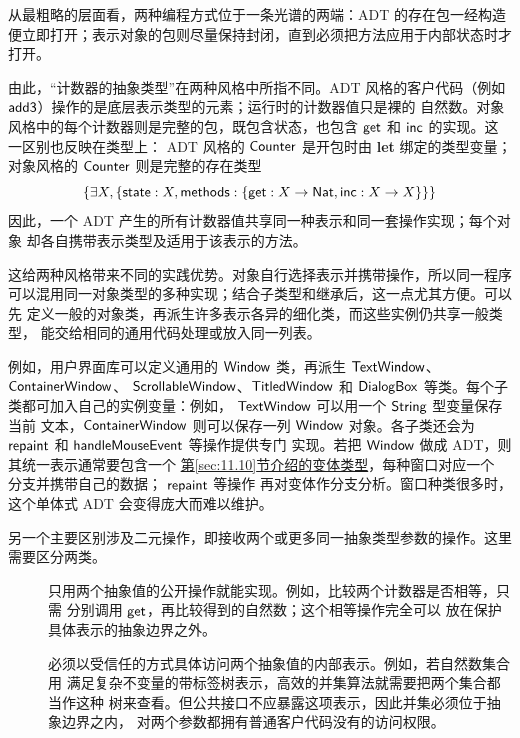 从最粗略的层面看，两种编程方式位于一条光谱的两端：ADT 的存在包一经构造
便立即打开；表示对象的包则尽量保持封闭，直到必须把方法应用于内部状态时才
打开。

由此，“计数器的抽象类型”在两种风格中所指不同。ADT 风格的客户代码（例如
\(\mathsf{add3}\)）操作的是底层表示类型的元素；运行时的计数器值只是裸的
自然数。对象风格中的每个计数器则是完整的包，既包含状态，也包含
\(\mathsf{get}\) 和 \(\mathsf{inc}\) 的实现。这一区别也反映在类型上：
ADT 风格的 \(\mathsf{Counter}\) 是开包时由 \textbf{let} 绑定的类型变量；
对象风格的 \(\mathsf{Counter}\) 则是完整的存在类型
\[
\{\exists X,
  \{\mathsf{state}:X,
    \mathsf{methods}:\{\mathsf{get}:X\to\mathsf{Nat},
                         \mathsf{inc}:X\to X\}\}\}
\]
因此，一个 ADT 产生的所有计数器值共享同一种表示和同一套操作实现；每个对象
却各自携带表示类型及适用于该表示的方法。

这给两种风格带来不同的实践优势。对象自行选择表示并携带操作，所以同一程序
可以混用同一对象类型的多种实现；结合子类型和继承后，这一点尤其方便。可以先
定义一般的对象类，再派生许多表示各异的细化类，而这些实例仍共享一般类型，
能交给相同的通用代码处理或放入同一列表。

例如，用户界面库可以定义通用的 \(\mathsf{Window}\) 类，再派生
\(\mathsf{TextWindow}\)、\(\mathsf{ContainerWindow}\)、
\(\mathsf{ScrollableWindow}\)、\(\mathsf{TitledWindow}\) 和
\(\mathsf{DialogBox}\) 等类。每个子类都可加入自己的实例变量：例如，
\(\mathsf{TextWindow}\) 可以用一个 \(\mathsf{String}\) 型变量保存当前
文本，\(\mathsf{ContainerWindow}\) 则可以保存一列 \(\mathsf{Window}\)
对象。各子类还会为
\(\mathsf{repaint}\) 和 \(\mathsf{handleMouseEvent}\) 等操作提供专门
实现。若把 \(\mathsf{Window}\) 做成 ADT，则其统一表示通常要包含一个
\hyperref[sec:11.10]{第\ref*{sec:11.10}节介绍的变体类型}，每种窗口对应一个
分支并携带自己的数据；
\(\mathsf{repaint}\) 等操作
再对变体作分支分析。窗口种类很多时，这个单体式 ADT 会变得庞大而难以维护。

另一个主要区别涉及二元操作，即接收两个或更多同一抽象类型参数的操作。这里
需要区分两类。
\begin{description}
  \item[]
    只用两个抽象值的公开操作就能实现。例如，比较两个计数器是否相等，只需
    分别调用 \(\mathsf{get}\)，再比较得到的自然数；这个相等操作完全可以
    放在保护具体表示的抽象边界之外。
  \item[]
    必须以受信任的方式具体访问两个抽象值的内部表示。例如，若自然数集合用
    满足复杂不变量的带标签树表示，高效的并集算法就需要把两个集合都当作这种
    树来查看。但公共接口不应暴露这项表示，因此并集必须位于抽象边界之内，
    对两个参数都拥有普通客户代码没有的访问权限。
\end{description}

